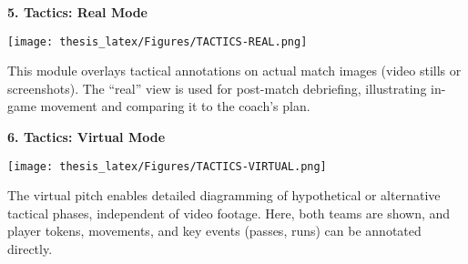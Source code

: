 \documentclass[11pt,a4paper,openright]{report}
\begin{document}
\textbf{5. Tactics: Real Mode}\
\begin{center}
\texttt{[image: thesis\_latex/Figures/TACTICS-REAL.png]}
\end{center}
\noindent
This module overlays tactical annotations on actual match images (video stills or screenshots). The “real” view is used for post-match debriefing, illustrating in-game movement and comparing it to the coach’s plan.

\textbf{6. Tactics: Virtual Mode}\
\begin{center}
\texttt{[image: thesis\_latex/Figures/TACTICS-VIRTUAL.png]}
\end{center}
\noindent
The virtual pitch enables detailed diagramming of hypothetical or alternative tactical phases, independent of video footage. Here, both teams are shown, and player tokens, movements, and key events (passes, runs) can be annotated directly.
\end{document}
